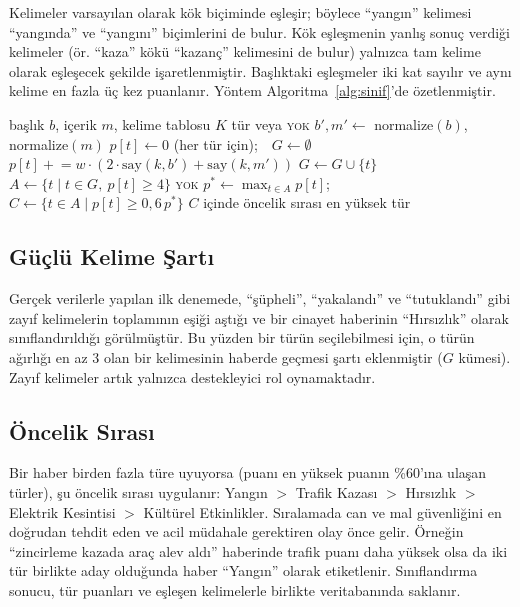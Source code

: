 \documentclass[conference,a4paper]{IEEEtran}
\begin{document}
Kelimeler varsayılan olarak kök biçiminde eşleşir; böylece ``yangın'' kelimesi
``yangında'' ve ``yangını'' biçimlerini de bulur. Kök eşleşmenin yanlış sonuç
verdiği kelimeler (ör. ``kaza'' kökü ``kazanç'' kelimesini de bulur) yalnızca tam
kelime olarak eşleşecek şekilde işaretlenmiştir. Başlıktaki eşleşmeler iki kat
sayılır ve aynı kelime en fazla üç kez puanlanır. Yöntem Algoritma~\ref{alg:sinif}'de
özetlenmiştir.

\begin{algorithm}[!t]
\caption{Haber türü sınıflandırma}
\label{alg:sinif}
\footnotesize
\begin{algorithmic}[1]
\Require başlık $b$, içerik $m$, kelime tablosu $K$
\Ensure tür veya \textsc{yok}
\State $b', m' \gets$ normalize$(b)$, normalize$(m)$
\State $p[t] \gets 0$ (her tür için);\ \ $G \gets \emptyset$
  \State $p[t] \mathrel{+}= w \cdot (2\cdot\text{say}(k,b') + \text{say}(k,m'))$
   \State $G \gets G \cup \{t\}$ \EndIf
\EndFor
\State $A \gets \{t \mid t \in G,\ p[t] \ge 4\}$
 \Return \textsc{yok} \EndIf
\State $p^* \gets \max_{t\in A} p[t]$;\ \ $C \gets \{t \in A \mid p[t] \ge 0{,}6\,p^*\}$
\State \Return $C$ içinde öncelik sırası en yüksek tür
\end{algorithmic}
\end{algorithm}

\subsection{Güçlü Kelime Şartı}
Gerçek verilerle yapılan ilk denemede, ``şüpheli'', ``yakalandı'' ve
``tutuklandı'' gibi zayıf kelimelerin toplamının eşiği aştığı ve bir cinayet
haberinin ``Hırsızlık'' olarak sınıflandırıldığı görülmüştür. Bu yüzden bir
türün seçilebilmesi için, o türün ağırlığı en az 3 olan bir kelimesinin haberde
geçmesi şartı eklenmiştir ($G$ kümesi). Zayıf kelimeler artık yalnızca
destekleyici rol oynamaktadır.

\subsection{Öncelik Sırası}
Bir haber birden fazla türe uyuyorsa (puanı en yüksek puanın \%60'ına ulaşan
türler), şu öncelik sırası uygulanır: Yangın $>$ Trafik Kazası $>$ Hırsızlık $>$
Elektrik Kesintisi $>$ Kültürel Etkinlikler. Sıralamada can ve mal güvenliğini en
doğrudan tehdit eden ve acil müdahale gerektiren olay önce gelir. Örneğin
``zincirleme kazada araç alev aldı'' haberinde trafik puanı daha yüksek olsa da
iki tür birlikte aday olduğunda haber ``Yangın'' olarak etiketlenir.
Sınıflandırma sonucu, tür puanları ve eşleşen kelimelerle birlikte
veritabanında saklanır.
\end{document}
